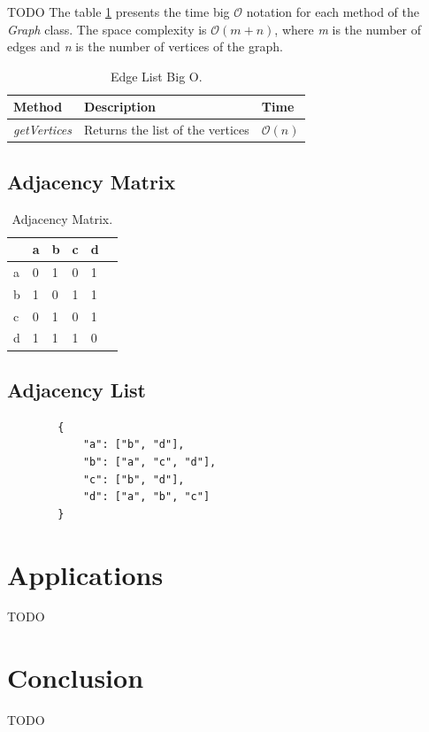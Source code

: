\documentclass[a4paper]{article}
\begin{document}
    TODO The table \ref{tab:edge-list-o} presents the 
    time big $\mathcal{O}$ notation for each method of the 
    \emph{Graph} class.
    The space complexity is $\mathcal{O}(m+n)$, where 
    \emph{m} is the number of edges and \emph{n} is the 
    number of vertices of the graph.

    \begin{table}[H]
        \centering
        \caption{\label{tab:edge-list-o}Edge List Big O.}
        \vspace*{10pt}
        \begin{tabular}{ |l|l|l| } 
            \hline
            Method & Description & Time \\
            \hline
            \emph{getVertices} & 
                Returns the list of the vertices & 
                $\mathcal{O}(n)$ \\
            \hline
        \end{tabular}
    \end{table}





    \subsection{Adjacency Matrix} \label{adjacency_matrix}

        
    \begin{table}[H]
        \centering
        \caption{\label{tab:adjacency-matrix}Adjacency Matrix.}
        \vspace*{10pt}
        \begin{tabular}{ l|l|l|l|l|l| } 
                & a & b & c & d \\
            \hline
            a   & 0 & 1 & 0 & 1 \\
            b   & 1 & 0 & 1 & 1 \\
            c   & 0 & 1 & 0 & 1 \\
            d   & 1 & 1 & 1 & 0 \\
            \hline
        \end{tabular}
    \end{table}



    \subsection{Adjacency List} \label{adjacency_list}


    \begin{verbatim}
        { 
            "a": ["b", "d"],
            "b": ["a", "c", "d"],
            "c": ["b", "d"],
            "d": ["a", "b", "c"]
        }
    \end{verbatim}


    \section{Applications}
    TODO


    \section*{Conclusion}
    TODO

    
     
\end{document}

